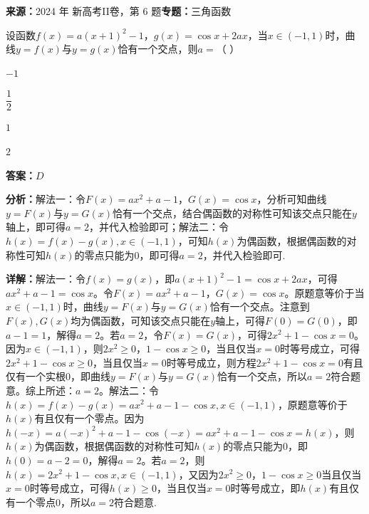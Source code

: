 \begin{question}[points=5]
\textbf{来源：}2024 年 新高考II卷，第 6 题\quad \textbf{专题：}三角函数\par
设函数$f(x)=a(x+1)^2-1$，$g(x)=\cos x+2ax$，当$x\in(-1,1)$时，曲线$y=f(x)$与$y=g(x)$恰有一个交点，则$a=$（ ）
\begin{choices}
  \item $-1$
  \item $\dfrac{1}{2}$
  \item $1$
  \item $2$
\end{choices}
\begin{solution}
\textbf{答案：}$D$

\textbf{分析：}解法一：令$F(x)=ax^2+a-1$，$G(x)=\cos x$，分析可知曲线$y=F(x)$与$y=G(x)$恰有一个交点，结合偶函数的对称性可知该交点只能在$y$轴上，即可得$a=2$，并代入检验即可；解法二：令$h(x)=f(x)-g(x),x\in(-1,1)$，可知$h(x)$为偶函数，根据偶函数的对称性可知$h(x)$的零点只能为0，即可得$a=2$，并代入检验即可.

\textbf{详解：}解法一：令$f(x)=g(x)$，即$a(x+1)^2-1=\cos x+2ax$，可得$ax^2+a-1=\cos x$。令$F(x)=ax^2+a-1$，$G(x)=\cos x$。原题意等价于当$x\in(-1,1)$时，曲线$y=F(x)$与$y=G(x)$恰有一个交点。注意到$F(x),G(x)$均为偶函数，可知该交点只能在$y$轴上，可得$F(0)=G(0)$，即$a-1=1$，解得$a=2$。若$a=2$，令$F(x)=G(x)$，可得$2x^2+1-\cos x=0$。因为$x\in(-1,1)$，则$2x^2\ge0$，$1-\cos x\ge0$，当且仅当$x=0$时等号成立，可得$2x^2+1-\cos x\ge0$，当且仅当$x=0$时等号成立，则方程$2x^2+1-\cos x=0$有且仅有一个实根0，即曲线$y=F(x)$与$y=G(x)$恰有一个交点，所以$a=2$符合题意。综上所述：$a=2$。解法二：令$h(x)=f(x)-g(x)=ax^2+a-1-\cos x,x\in(-1,1)$，原题意等价于$h(x)$有且仅有一个零点。因为$h(-x)=a(-x)^2+a-1-\cos(-x)=ax^2+a-1-\cos x=h(x)$，则$h(x)$为偶函数，根据偶函数的对称性可知$h(x)$的零点只能为0，即$h(0)=a-2=0$，解得$a=2$。若$a=2$，则$h(x)=2x^2+1-\cos x,x\in(-1,1)$，又因为$2x^2\ge0$，$1-\cos x\ge0$当且仅当$x=0$时等号成立，可得$h(x)\ge0$，当且仅当$x=0$时等号成立，即$h(x)$有且仅有一个零点0，所以$a=2$符合题意.
\end{solution}
\end{question}

